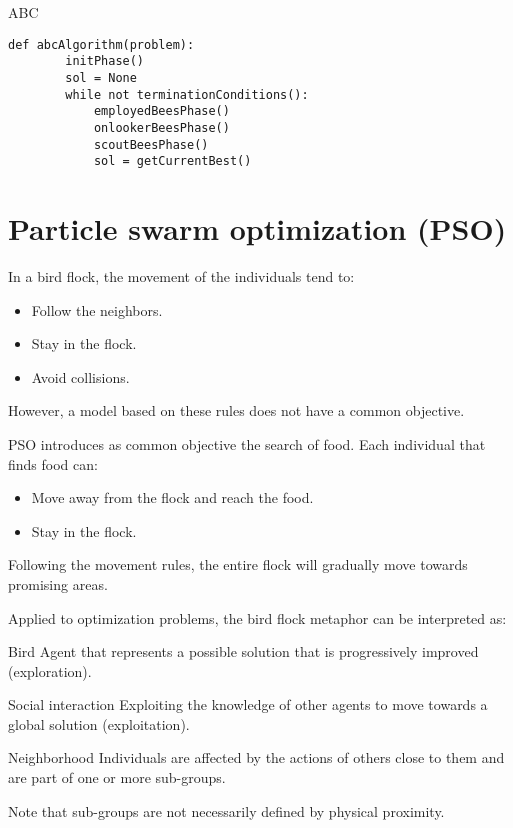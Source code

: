 \begin{algorithm}
\caption{ABC}
\begin{lstlisting}[mathescape=true]
    def abcAlgorithm(problem):
        initPhase()
        sol = None
        while not terminationConditions():
            employedBeesPhase()
            onlookerBeesPhase()
            scoutBeesPhase()
            sol = getCurrentBest()
\end{lstlisting}
\end{algorithm}



\section{Particle swarm optimization (PSO)}

In a bird flock, the movement of the individuals tend to:
\begin{itemize}
    \item Follow the neighbors.
    \item Stay in the flock.
    \item Avoid collisions.
\end{itemize}
However, a model based on these rules does not have a common objective.

PSO introduces as common objective the search of food.
Each individual that finds food can:
\begin{itemize}
    \item Move away from the flock and reach the food.
    \item Stay in the flock.
\end{itemize}
Following the movement rules, the entire flock will gradually move towards promising areas.

Applied to optimization problems, the bird flock metaphor can be interpreted as:
\begin{descriptionlist}
    \item[Bird] 
        Agent that represents a possible solution that is progressively improved (exploration).

    \item[Social interaction] 
        Exploiting the knowledge of other agents to move towards a global solution (exploitation).

    \item[Neighborhood]
        Individuals are affected by the actions of others close to them and are part of one or more sub-groups.

        Note that sub-groups are not necessarily defined by physical proximity.
\end{descriptionlist}

